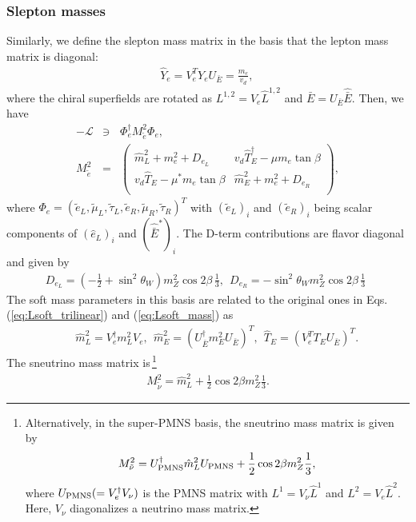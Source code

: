 \documentclass[preprint,3p,12pt]{elsarticle}
\begin{document}
\subsubsection{Slepton masses}
Similarly, we define the slepton mass matrix in the basis that the lepton mass matrix is diagonal:
\begin{eqnarray}
\hat Y_e = V_e^T Y_e U_{\bar E} = \frac{m_e}{v_d} , \, 
\end{eqnarray}
where the chiral superfields are rotated as $L^{1,2} = V_e \hat L^{1,2}$ and $\bar E = U_{\bar E} \hat{\bar E}$.
Then, we have
\begin{eqnarray}
-\mathcal{L} &\ni& \Phi_e^\dag  M_{\tilde e}^2 \Phi_e, \nonumber \\
M_{\tilde e}^2 &=& 
\left(
\begin{array}{cc}
\hat m_L^2  + m_e^2 + D_{e_L}&    v_d \hat T_E^\dag - \mu m_e \tan\beta  \\
v_d \hat T_E  - \mu^* m_e \tan\beta&    \hat m_{E}^2 + m_e^2 + D_{e_R}\\
\end{array}
\right),
\end{eqnarray}
where $\Phi_e = \left( \tilde e_L, \tilde \mu_L,  \tilde \tau_L,  \tilde e_R, \tilde \mu_R,  \tilde \tau_R
\right)^T$ with $(\tilde e_L)_i$ and $(\tilde e_R)_i$ being scalar components of $(\hat e_L)_i$ and $(\hat{\bar E}^*)_i$. The D-term contributions are flavor diagonal and given by
\begin{eqnarray}
D_{e_L} = (-\frac{1}{2}  + \sin^2\theta_W) m_Z^2 \cos2 \beta \, \frac{1}{3}, \ \
D_{e_R}= - \sin^2\theta_W m_Z^2 \cos2 \beta \, \frac{1}{3}\ \ 
\end{eqnarray}
The soft mass parameters in this basis are related to the original ones in Eqs. (\ref{eq:Lsoft_trilinear}) and (\ref{eq:Lsoft_mass}) as
 \begin{eqnarray}
&& \hat m_{L}^2 = V_{e}^\dag m_{L}^2 V_e, \ \ \hat m_E^2  = (U_{\bar E}^\dag m_{E}^2 U_{\bar E})^T, \ \ 
 \hat T_E = (V_e^T T_E U_{\bar E})^T.
\end{eqnarray}
The sneutrino mass matrix is\,\footnote{
%
Alternatively, in the super-PMNS basis, the sneutrino mass matrix is given by
\begin{eqnarray}
M_{\tilde \nu}^2 = U_{\rm PMNS}^\dag \hat m_{L}^2 U_{\rm PMNS} +  \frac{1}{2}\cos2\beta m_Z^2 \frac{1}{3},
\end{eqnarray}
where $U_{\rm PMNS} ( = V_e^\dag V_{\nu} )$ is the PMNS matrix with $L^{1} = V_{\nu} \hat L^{1}$ and $L^{2} = V_{e} \hat L^{2}$.
Here, $V_{\nu}$ diagonalizes a neutrino mass matrix.
%
}
\begin{eqnarray}
M_{\tilde \nu}^2 = \hat m_{L}^2  +  \frac{1}{2}\cos2\beta m_Z^2 \frac{1}{3}.
\end{eqnarray}
\end{document}
